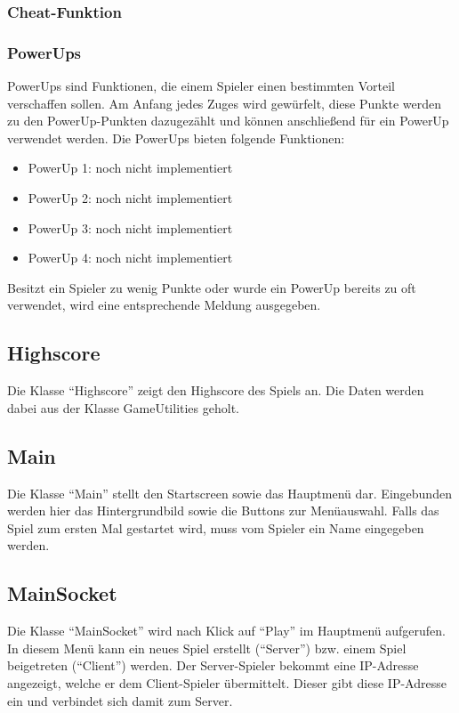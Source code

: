 \documentclass[11pt]{article} %
\begin{document}
\subsubsection{Cheat-Funktion}

\subsubsection{PowerUps}
PowerUps sind Funktionen, die einem Spieler einen bestimmten Vorteil verschaffen sollen. Am Anfang jedes Zuges wird gewürfelt, diese Punkte werden zu den PowerUp-Punkten dazugezählt und können anschließend für ein PowerUp verwendet werden.
Die PowerUps bieten folgende Funktionen:
\begin{itemize}
\item PowerUp 1: noch nicht implementiert
\item PowerUp 2: noch nicht implementiert
\item PowerUp 3: noch nicht implementiert
\item PowerUp 4: noch nicht implementiert
\end{itemize}

Besitzt ein Spieler zu wenig Punkte oder wurde ein PowerUp bereits zu oft verwendet, wird eine entsprechende Meldung ausgegeben.

\subsection{Highscore}
Die Klasse \enquote{Highscore} zeigt den Highscore des Spiels an. Die Daten werden dabei aus der Klasse GameUtilities geholt.

\subsection{Main}
Die Klasse \enquote{Main} stellt den Startscreen sowie das Hauptmenü dar. Eingebunden werden hier das Hintergrundbild sowie die Buttons zur Menüauswahl. Falls das Spiel zum ersten Mal gestartet wird, muss vom Spieler ein Name eingegeben werden.

\subsection{MainSocket}
Die Klasse \enquote{MainSocket} wird nach Klick auf \enquote{Play} im Hauptmenü aufgerufen. In diesem Menü kann ein neues Spiel erstellt (\enquote{Server}) bzw. einem Spiel beigetreten (\enquote{Client}) werden.
Der Server-Spieler bekommt eine IP-Adresse angezeigt, welche er dem Client-Spieler übermittelt. Dieser gibt diese IP-Adresse ein und verbindet sich damit zum Server.
\end{document}
